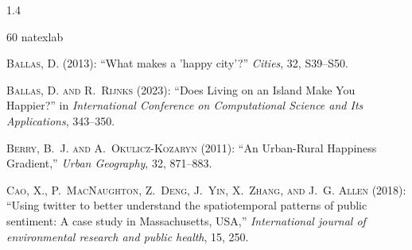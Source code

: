 \documentclass[10pt, letterpaper]{article}
\begin{document}
\begin{spacing}{1.4}





\newpage
%
\begin{thebibliography}{60}
\newcommand{\enquote}[1]{``#1''}
\expandafter\ifx\csname natexlab\endcsname\relax\def\natexlab#1{#1}\fi

\textsc{Ballas, D.} (2013): \enquote{What makes a 'happy city'?} \emph{Cities},
  32, S39--S50.

\textsc{Ballas, D. and R.~Rijnks} (2023): \enquote{Does Living on an Island
  Make You Happier?} in \emph{International Conference on Computational Science
  and Its Applications}, 343--350.

\textsc{Berry, B.~J. and A.~Okulicz-Kozaryn} (2011): \enquote{An Urban-Rural
  Happiness Gradient,} \emph{Urban Geography}, 32, 871--883.

\textsc{Cao, X., P.~MacNaughton, Z.~Deng, J.~Yin, X.~Zhang, and J.~G. Allen}
  (2018): \enquote{Using twitter to better understand the spatiotemporal
  patterns of public sentiment: A case study in Massachusetts, USA,}
  \emph{International journal of environmental research and public health}, 15,
  250.


\end{thebibliography}
\end{spacing}
\end{document}

